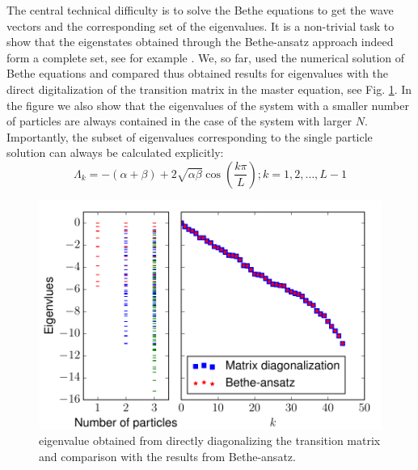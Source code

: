 \documentclass[aps,showpacs,twocolumn,floatfix,prx,superscriptaddress]{revtex4-1}
\begin{document}
The central technical difficulty is to solve the Bethe equations to get the wave vectors and the corresponding set of the eigenvalues. It is a non-trivial task to show that the eigenstates obtained through the Bethe-ansatz approach indeed form a complete set, see for example \cite{Brattain2015}. We, so far, used the numerical solution of Bethe equations and compared thus obtained results for eigenvalues with the direct digitalization of the transition matrix in the master equation, see Fig. \ref{fig:spectrum}. In the figure we also show that the eigenvalues of the system with a smaller number of particles are always contained in the case of the system with larger $N$. Importantly, the subset of eigenvalues corresponding to the single particle solution can always be calculated explicitly: 
    \begin{equation}
        \label{eq:partEigenvaluesN}
        \Lambda_k   = -(\alpha+\beta) + 2\sqrt{\alpha\beta}\cos(\frac{k\pi}{L}); 
        k=1,2,\dots, L-1  
    \end{equation}
\begin{figure}[htpb]
    \centering
    \includegraphics[width=1.0\linewidth]{spectrum}
    \caption{eigenvalue obtained from directly diagonalizing the transition matrix and comparison with the results from Bethe-ansatz.}
    \label{fig:spectrum}
\end{figure}
\end{document}

